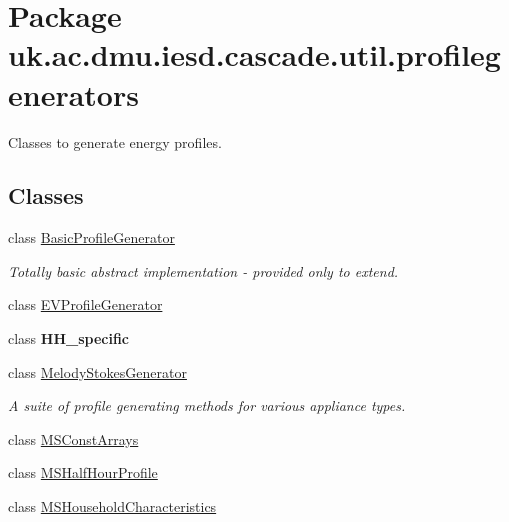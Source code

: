 \hypertarget{namespaceuk_1_1ac_1_1dmu_1_1iesd_1_1cascade_1_1util_1_1profilegenerators}{\section{Package uk.\-ac.\-dmu.\-iesd.\-cascade.\-util.\-profilegenerators}
\label{namespaceuk_1_1ac_1_1dmu_1_1iesd_1_1cascade_1_1util_1_1profilegenerators}
}


Classes to generate energy profiles.  


\subsection*{Classes}
\begin{DoxyCompactItemize}
\item 
class \hyperlink{classuk_1_1ac_1_1dmu_1_1iesd_1_1cascade_1_1util_1_1profilegenerators_1_1_basic_profile_generator}{Basic\-Profile\-Generator}
\begin{DoxyCompactList}\small\item\em Totally basic abstract implementation -\/ provided only to extend. \end{DoxyCompactList}\item 
class \hyperlink{classuk_1_1ac_1_1dmu_1_1iesd_1_1cascade_1_1util_1_1profilegenerators_1_1_e_v_profile_generator}{E\-V\-Profile\-Generator}
\item 
class {\bfseries H\-H\-\_\-specific}
\item 
class \hyperlink{classuk_1_1ac_1_1dmu_1_1iesd_1_1cascade_1_1util_1_1profilegenerators_1_1_melody_stokes_generator}{Melody\-Stokes\-Generator}
\begin{DoxyCompactList}\small\item\em A suite of profile generating methods for various appliance types. \end{DoxyCompactList}\item 
class \hyperlink{classuk_1_1ac_1_1dmu_1_1iesd_1_1cascade_1_1util_1_1profilegenerators_1_1_m_s_const_arrays}{M\-S\-Const\-Arrays}
\item 
class \hyperlink{classuk_1_1ac_1_1dmu_1_1iesd_1_1cascade_1_1util_1_1profilegenerators_1_1_m_s_half_hour_profile}{M\-S\-Half\-Hour\-Profile}
\item 
class \hyperlink{classuk_1_1ac_1_1dmu_1_1iesd_1_1cascade_1_1util_1_1profilegenerators_1_1_m_s_household_characteristics}{M\-S\-Household\-Characteristics}

\end{DoxyCompactItemize}
